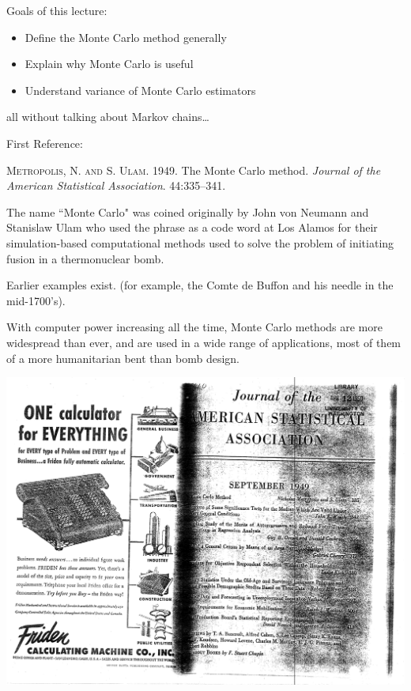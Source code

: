 








Goals of this lecture:
\begin{itemize}
\item Define the Monte Carlo method generally
\item Explain why Monte Carlo is useful
\item Understand variance of Monte Carlo estimators
\end{itemize}
all without talking about Markov chains\ldots


First Reference:

\textsc{Metropolis, N. and S. Ulam.}  1949.  The Monte Carlo method.  {\em Journal of the American Statistical Association}. 44:335--341.

The name ``Monte Carlo" was coined originally by John von Neumann and Stanislaw Ulam who used the phrase as a code word at Los Alamos for their simulation-based computational methods used to solve the problem of initiating fusion in a thermonuclear bomb. 

Earlier examples exist.  (for example, the Comte de Buffon and his needle in the mid-1700's).  

With computer power increasing all the time, Monte Carlo methods are more widespread than ever, and are used in a wide range of applications, most of them of a more humanitarian bent than bomb design.    

\newpage

\includegraphics[width=\textwidth]{illus/JASA_MC_Article_Adding_Machine.pdf}
 

